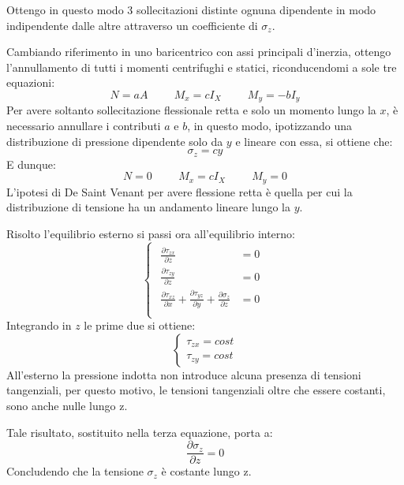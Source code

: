 \documentclass{article}
\begin{document}
\begin{adjustwidth}{2in}{}
		Ottengo in questo modo 3 sollecitazioni distinte ognuna dipendente in modo indipendente dalle altre attraverso un coefficiente di $\sigma_z$. \newline 
		
		Cambiando riferimento in uno baricentrico con assi principali d'inerzia, ottengo l'annullamento di tutti i momenti centrifughi e statici, riconducendomi a sole tre equazioni:
		\[ N = aA \hspace{1cm} M_x = cI_X \hspace{1cm} M_y = - bI_y  \]
		Per avere soltanto sollecitazione flessionale retta e solo un momento lungo la $x$, è necessario annullare i contributi $a$ e $b$, in questo modo, ipotizzando una distribuzione di pressione dipendente solo da $y$ e lineare con essa, si ottiene che: 
		\[\sigma_z = cy\]
		E dunque: 
		\[ N = 0 \hspace{1cm} M_x = cI_X \hspace{1cm} M_y = 0  \]
		L'ipotesi di De Saint Venant per avere flessione retta è quella per cui la distribuzione di tensione ha un andamento lineare lungo la $y$. \newline 
		
		Risolto l'equilibrio esterno si passi ora all'equilibrio interno:
			\[ \begin{cases}
			\begin{aligned}
				\frac{\partial \tau_{zx}}{\partial z} & =0 \\
				
				\frac{\partial \tau_{zy}}{\partial z} & =0 \\
				
				\frac{\partial \tau_{xz}}{\partial x} + \frac{\partial \tau_{yz}}{\partial y} + \frac{\partial\sigma_z}{\partial z} & =0 \\
			\end{aligned}
		\end{cases}\]
		Integrando in $z$ le prime due si ottiene:
		\[\begin{cases}
			\tau_{zx} = cost \\
			\tau_{zy} = cost 
		\end{cases}\]
		All'esterno la pressione indotta non introduce alcuna presenza di tensioni tangenziali, per questo motivo, le tensioni tangenziali oltre che essere costanti, sono anche nulle lungo z. 
		
		Tale risultato, sostituito nella terza equazione, porta a:
		\[ \frac{\partial\sigma_z}{\partial z}  =0\]
		Concludendo che la tensione $\sigma_z$ è costante lungo z. \newline 
		

\end{adjustwidth}
\end{document}
